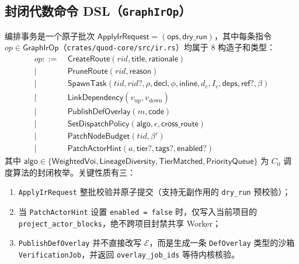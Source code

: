 \documentclass[10pt,a4paper,fontset=fandol]{ctexart}
\newcommand{\Truth}{\mathcal{E}}
\newcommand{\kw}[1]{\mathsf{#1}}
\newcommand{\code}[1]{\texttt{#1}}
\begin{document}
\subsection{封闭代数命令 DSL（\code{GraphIrOp}）}
编排事务是一个原子批次 $\kw{ApplyIrRequest} = (\kw{ops}, \kw{dry\_run})$，其中每条指令 $op \in \kw{GraphIrOp}$（\code{crates/\-quod-core/\-src/\-ir.rs}）均属于 8 构造子和类型：
\begin{align*}
op ::= &\ \kw{CreateRoute}(rid, \kw{title}, \kw{rationale}) \\
\mid &\ \kw{PruneRoute}(rid, \kw{reason}) \\
\mid &\ \kw{SpawnTask}(tid, rid?, \rho, \kw{decl}, \phi, \kw{inline}, d_c, I_v, \kw{deps}, \kw{ref}?, \beta) \\
\mid &\ \kw{LinkDependency}(v_{\mathrm{up}}, v_{\mathrm{down}}) \\
\mid &\ \kw{PublishDefOverlay}(m, \kw{code}) \\
\mid &\ \kw{SetDispatchPolicy}(\kw{algo}, \epsilon, \kw{cross\_route}) \\
\mid &\ \kw{PatchNodeBudget}(tid, \beta') \\
\mid &\ \kw{PatchActorHint}(a, \kw{tier}?, \kw{tags}?, \kw{enabled}?)
\end{align*}
其中 $\kw{algo} \in \{\kw{WeightedVoi}, \kw{LineageDiversity}, \kw{TierMatched}, \kw{PriorityQueue}\}$ 为 $C_0$ 调度算法的封闭枚举。关键性质有三：
\begin{enumerate}
  \item \code{ApplyIrRequest} 整批校验并原子提交（支持无副作用的 \code{dry\_run} 预校验）；
  \item 当 \code{PatchActorHint} 设置 \code{enabled = false} 时，仅写入当前项目的 \code{project\_actor\_blocks}，绝不跨项目封禁共享 Worker；
  \item \code{PublishDefOverlay} 并不直接改写 $\Truth$，而是生成一条 \code{DefOverlay} 类型的沙箱 \code{VerificationJob}，并返回 \code{overlay\_job\_ids} 等待内核核验。
\end{enumerate}
\end{document}
